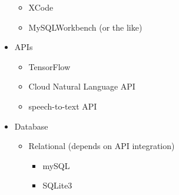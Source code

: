 \begin{itemize}
     \begin{itemize}
   	 	\item XCode
		\item MySQLWorkbench (or the like)
	\end{itemize}
    \item APIs
     \begin{itemize}
   	 	\item TensorFlow
		\item Cloud Natural Language API
		\item speech-to-text API
	\end{itemize}
    \item Database
     \begin{itemize}
   	 	\item Relational (depends on API integration)
		 \begin{itemize}
   	 		\item mySQL
			\item SQLite3
		\end{itemize}
	\end{itemize}
\end{itemize}